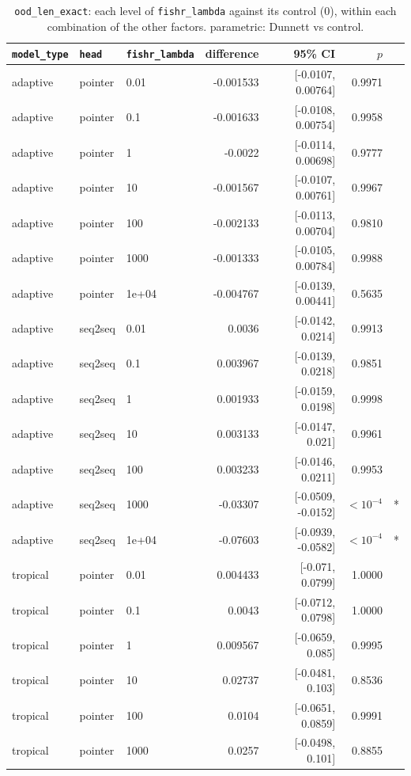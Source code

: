 \documentclass[10pt]{article}
\begin{document}
{\small
\begin{longtable}{lllrrrl}
\caption{\texttt{ood\_len\_exact}: each level of \texttt{fishr\_lambda} against its control (0), within each combination of the other factors. parametric: Dunnett vs control.}\label{tab:control-ood_len_exact}\\
\toprule
\texttt{model\_type} & \texttt{head} & \texttt{fishr\_lambda} & difference & 95\% CI & $p$ & \\
\midrule
\endhead
adaptive & pointer & 0.01 & -0.001533 & [-0.0107, 0.00764] & 0.9971 & \\
adaptive & pointer & 0.1 & -0.001633 & [-0.0108, 0.00754] & 0.9958 & \\
adaptive & pointer & 1 & -0.0022 & [-0.0114, 0.00698] & 0.9777 & \\
adaptive & pointer & 10 & -0.001567 & [-0.0107, 0.00761] & 0.9967 & \\
adaptive & pointer & 100 & -0.002133 & [-0.0113, 0.00704] & 0.9810 & \\
adaptive & pointer & 1000 & -0.001333 & [-0.0105, 0.00784] & 0.9988 & \\
adaptive & pointer & 1e+04 & -0.004767 & [-0.0139, 0.00441] & 0.5635 & \\
adaptive & seq2seq & 0.01 & 0.0036 & [-0.0142, 0.0214] & 0.9913 & \\
adaptive & seq2seq & 0.1 & 0.003967 & [-0.0139, 0.0218] & 0.9851 & \\
adaptive & seq2seq & 1 & 0.001933 & [-0.0159, 0.0198] & 0.9998 & \\
adaptive & seq2seq & 10 & 0.003133 & [-0.0147, 0.021] & 0.9961 & \\
adaptive & seq2seq & 100 & 0.003233 & [-0.0146, 0.0211] & 0.9953 & \\
adaptive & seq2seq & 1000 & -0.03307 & [-0.0509, -0.0152] & $<10^{-4}$ & *\\
adaptive & seq2seq & 1e+04 & -0.07603 & [-0.0939, -0.0582] & $<10^{-4}$ & *\\
tropical & pointer & 0.01 & 0.004433 & [-0.071, 0.0799] & 1.0000 & \\
tropical & pointer & 0.1 & 0.0043 & [-0.0712, 0.0798] & 1.0000 & \\
tropical & pointer & 1 & 0.009567 & [-0.0659, 0.085] & 0.9995 & \\
tropical & pointer & 10 & 0.02737 & [-0.0481, 0.103] & 0.8536 & \\
tropical & pointer & 100 & 0.0104 & [-0.0651, 0.0859] & 0.9991 & \\
tropical & pointer & 1000 & 0.0257 & [-0.0498, 0.101] & 0.8855 & \\

\end{longtable}}
\end{document}
